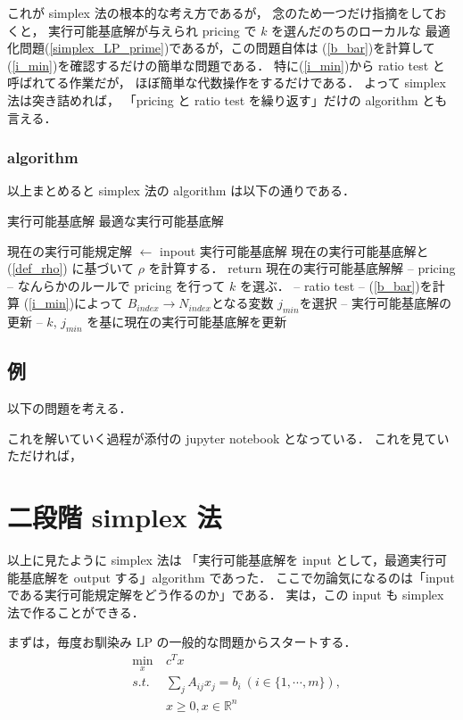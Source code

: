 \documentclass[11pt, a4]{article}
\begin{document}
これが simplex 法の根本的な考え方であるが，
念のため一つだけ指摘をしておくと，
実行可能基底解が与えられ pricing で $k$ を選んだのちのローカルな
最適化問題(\ref{simplex_LP_prime})であるが，この問題自体は
 (\ref{b_bar})を計算して(\ref{i_min})を確認するだけの簡単な問題である．
特に(\ref{i_min})から ratio test と呼ばれてる作業だが，
ほぼ簡単な代数操作をするだけである．
よって simplex 法は突き詰めれば，
「pricing と ratio test を繰り返す」だけの algorithm とも言える．

\subsubsection{algorithm}
以上まとめると simplex 法の algorithm は以下の通りである．
\begin{algorithm}
\begin{algorithmic}
  \REQUIRE 実行可能基底解
  \ENSURE 最適な実行可能基底解

  現在の実行可能規定解 $\leftarrow$ inpout 実行可能基底解
  \LOOP
  \STATE 現在の実行可能基底解と(\ref{def_rho}) に基づいて $\rho$ を計算する．
  \STATE return 現在の実行可能基底解解
  \ENDIF
  \STATE -- pricing --
  \STATE なんらかのルールで pricing を行って $k$ を選ぶ．
  \STATE -- ratio test --
  \STATE (\ref{b_bar})を計算
  \STATE (\ref{i_min})によって $B_{index}\rightarrow N_{index}$となる変数 $j_{min}$を選択
  \STATE -- 実行可能基底解の更新 --
  \STATE $k$, $j_{min}$ を基に現在の実行可能基底解を更新
  \ENDLOOP
\end{algorithmic}
\end{algorithm}
\subsection{例}
以下の問題を考える．

これを解いていく過程が添付の jupyter notebook となっている．
これを見ていただければ，

\section{二段階 simplex 法}

以上に見たように simplex 法は
「実行可能基底解を input として，最適実行可能基底解を output する」algorithm であった．
ここで勿論気になるのは「input である実行可能規定解をどう作るのか」である．
実は，この input も simplex 法で作ることができる．

まずは，毎度お馴染み LP の一般的な問題からスタートする．
\begin{eqnarray}
  &\min_{x}&\ c^Tx\nonumber\\
  &s.t.&\ \sum_jA_{ij}x_j = b_i\ (i \in \{1, \cdots, m\}) , \nonumber\\
  &\ &\ x\geq 0, x \in \mathbb{R}^n
  \label{org_LP}
\end{eqnarray}
\end{document}
